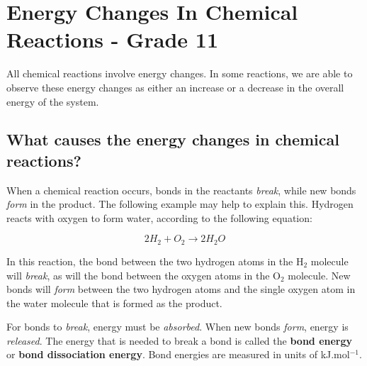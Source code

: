 






\chapter{Energy Changes In Chemical Reactions - Grade 11}
\label{chap:energychanges}

All chemical reactions involve energy changes. In some reactions, we are able to observe these energy changes as either an increase or a decrease in the overall energy of the system.



\section{What causes the energy changes in chemical reactions?}

When a chemical reaction occurs, bonds in the reactants \textit{break}, while new bonds \textit{form} in the product. The following example may help to explain this.
Hydrogen reacts with oxygen to form water, according to the following equation:

\begin{equation*}
2H_{2} + O_{2} \rightarrow 2H_{2}O 
\label{eqnfirst:ec:ec}
\end{equation*}

In this reaction, the bond between the two hydrogen atoms in the H$_{2}$ molecule will \textit{break}, as will the bond between the oxygen atoms in the O$_{2}$ molecule. New bonds will \textit{form} between the two hydrogen atoms and the single oxygen atom in the water molecule that is formed as the product.

For bonds to \textit{break}, energy must be \textit{absorbed}. When new bonds \textit{form}, energy is \textit{released}. The energy that is needed to break a bond is called the \textbf{bond energy} or \textbf{bond dissociation energy}. Bond energies are measured in units of kJ.mol$^{-1}$. 







